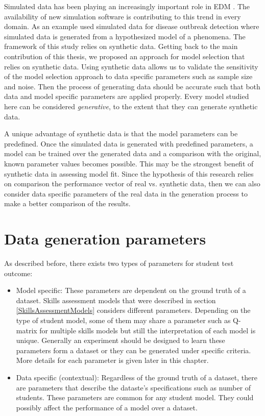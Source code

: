 \label{sec:Syn}


Simulated data has been playing an increasingly important role in EDM \citep{JEDM:baker2009}. The availability of new simulation software is contributing to this trend in every domain. As an example \citet{jafarpour2015quantifying} used simulated data for disease outbreak detection where simulated data is generated from a hypothesized model of a phenomena. The framework of this study relies on synthetic data. Getting back to the main contribution of this thesis, we proposed an approach for model selection that relies on synthetic data. Using synthetic data allows us to validate the sensitivity of the model selection approach to data specific parameters such as sample size and noise. Then the process of generating data should be accurate such that both data  and model specific parameters are applied properly. Every model studied here can be considered \textit{generative}, to the extent that they can generate synthetic data.

A unique advantage of synthetic data is that the model parameters can be predefined. Once the simulated data is generated with predefined parameters, a model can be trained over the generated data and a comparison with the original, known parameter values becomes possible. This may be the strongest benefit of synthetic data in assessing model fit. Since the hypothesis of this research relies on comparison the performance vector of real vs. synthetic data, then we can also consider data specific parameters of the real data in the generation process to make a better comparison of the results.

\section{Data generation parameters}

As described before, there exists two types of parameters for student test outcome:
\begin{itemize}
\item Model specific: These parameters are dependent on the ground truth of a dataset. Skills assessment models that were described in section \ref{SkillsAssessmentModels} considers different parameters. Depending on the type of student model, some of them may share a parameter such as Q-matrix for multiple skills models but still the interpretation of each model is unique. Generally an experiment should be designed to learn these parameters form a dataset or they can be generated under specific criteria. More details for each parameter is given later in this chapter.
\item Data specific (contextual): Regardless of the ground truth of a dataset, there are parameters that describe the dataste's specifications such as number of students. These parameters are common for any student model. They could possibly affect the performance of a model over a dataset.
\end{itemize}

